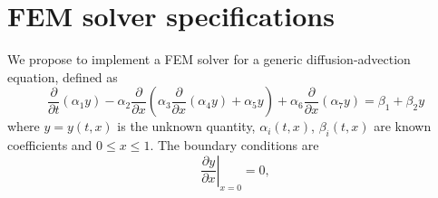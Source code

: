 \section{FEM solver specifications} %
\label{sec:fem_solver}

We propose to implement a FEM solver for a generic diffusion-advection equation, defined as
\begin{equation}
\frac{\partial }{{\partial t}}\left( {{\alpha _1}y} \right) - {\alpha _2}\frac{\partial }{{\partial x}}\left( {{\alpha _3}\frac{\partial }{{\partial x}}\left( {{\alpha _4}y} \right) + {\alpha _5}y} \right) + {\alpha _6}\frac{\partial }{{\partial x}}\left( {{\alpha _7}y} \right) = {\beta _1} + {\beta _2}y
\end{equation}
where $y = y\left( t, x \right)$ is the unknown quantity, $\alpha_i\left( t, x \right)$, $\beta_i\left( t, x \right)$ are known coefficients and $0\leq x \leq 1$. The boundary conditions are
\begin{equation}
{\left. {\frac{{\partial y}}{{\partial x}}} \right|_{x = 0}} = 0,
\end{equation}
